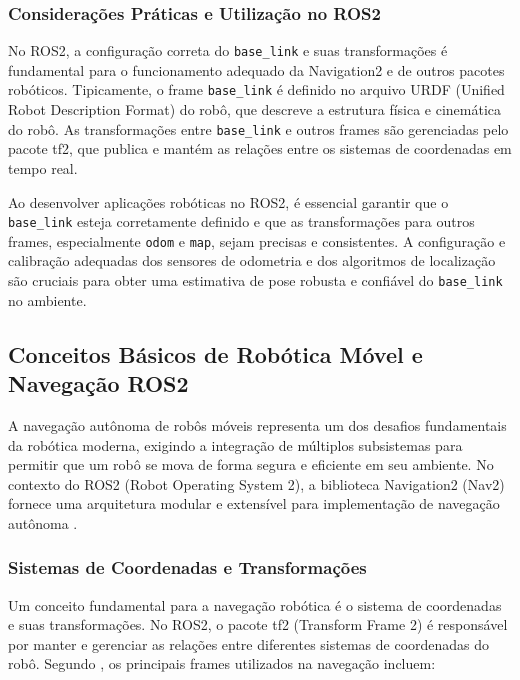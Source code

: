 \subsubsection{Considerações Práticas e Utilização no ROS2}

No ROS2, a configuração correta do \texttt{base\_link} e suas transformações é
fundamental para o funcionamento adequado da Navigation2 e de outros pacotes
robóticos. Tipicamente, o frame \texttt{base\_link} é definido no arquivo URDF
(Unified Robot Description Format) do robô, que descreve a estrutura física e
cinemática do robô. As transformações entre \texttt{base\_link} e outros frames
são gerenciadas pelo pacote tf2, que publica e mantém as relações entre os
sistemas de coordenadas em tempo real.

Ao desenvolver aplicações robóticas no ROS2, é essencial garantir que o
\texttt{base\_link} esteja corretamente definido e que as transformações para
outros frames, especialmente \texttt{odom} e \texttt{map}, sejam precisas e
consistentes. A configuração e calibração adequadas dos sensores de odometria e
dos algoritmos de localização são cruciais para obter uma estimativa de pose
robusta e confiável do \texttt{base\_link} no ambiente.

\subsection{Conceitos Básicos de Robótica Móvel e Navegação ROS2}

A navegação autônoma de robôs móveis representa um dos desafios fundamentais da
robótica moderna, exigindo a integração de múltiplos subsistemas para permitir
que um robô se mova de forma segura e eficiente em seu ambiente. No contexto do
ROS2 (Robot Operating System 2), a biblioteca Navigation2 (Nav2) fornece uma
arquitetura modular e extensível para implementação de navegação autônoma
\cite{OKelly2020F1TENTH}.

\subsubsection{Sistemas de Coordenadas e Transformações}

Um conceito fundamental para a navegação robótica é o sistema de coordenadas e
suas transformações. No ROS2, o pacote tf2 (Transform Frame 2) é responsável
por manter e gerenciar as relações entre diferentes sistemas de coordenadas do
robô. Segundo \cite{Babu2020Simulator}, os principais frames utilizados na
navegação incluem:


